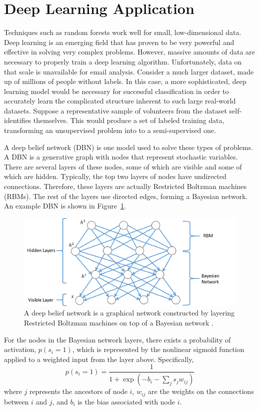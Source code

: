 \documentclass[12pt]{report}
\begin{document}
\section{Deep Learning Application}
Techniques such as random forests work well for small, low-dimensional data.
Deep learning is an emerging field that has proven to be very powerful and effective in solving very complex problems.
However, massive amounts of data are necessary to properly train a deep learning algorithm.
Unfortunately, data on that scale is unavailable for email analysis.
Consider a much larger dataset, made up of millions of people without labels.
In this case, a more sophisticated, deep learning model would be necessary for successful classification in order to accurately learn the complicated structure inherent to such large real-world datasets.
Suppose a representative sample of volunteers from the dataset self-identifies themselves.
This would produce a set of labeled training data, transforming an unsupervised problem into to a semi-supervised one. 

A deep belief network (DBN) is one model used to solve these types of problems. 
A DBN is a generative graph with nodes that represent stochastic variables.
There are several layers of these nodes, some of which are visible and some of which are hidden.
Typically, the top two layers of nodes have undirected connections.
Therefore, these layers are actually Restricted Boltzman machines (RBMs).
The rest of the layers use directed edges, forming a Bayesian network.
An example DBN is shown in Figure~\ref{fig:DBN}.

\begin{figure}[t]
    \centering
        \includegraphics[width=.7\columnwidth,trim={0mm 0mm 0mm 0mm},clip]{dbn}
        \vspace{-7pt}
        \caption[The Components of a Deep Belief Network]{A deep belief network is a graphical network constructed by layering Restricted Boltzman machines on top of a Bayesian network \cite{hinton_fast_2006}.}
        \label{fig:DBN}
\end{figure}

For the nodes in the Bayesian network layers, there exists a probability of activation, $p(s_i=1)$, which is represented by the nonlinear sigmoid function applied to a weighted input from the layer above.
Specifically,
\begin{equation}
p(s_i=1) = \frac{1}{1+\exp \left(-b_i-\sum_j s_j w_{ij}\right)}
\end{equation}
where $j$ represents the ancestors of node $i$, $w_{ij}$ are the weights on the connections between $i$ and $j$, and $b_i$ is the bias associated with node $i$.
\end{document}
